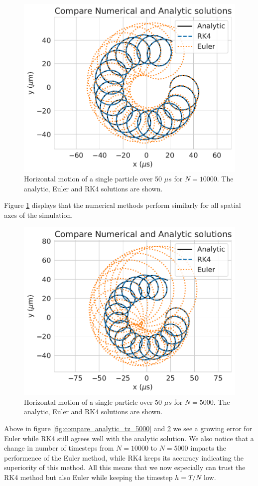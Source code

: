\documentclass[english,notitlepage,reprint,nofootinbib]{revtex4-1}  %
\begin{document}
\begin{figure}[H]
    \centering
    \includegraphics[width=.5\textwidth]{../figures/compare_analytic_axis_0_1_N10000.pdf}
    \caption{Horizontal motion of a single particle over 50 $\mu s$ for $N=10000$. The analytic, Euler and RK4 solutions are shown.}
    \label{fig:compare_analytic_axis_0_1_N10000}
\end{figure}
Figure \ref{fig:compare_analytic_axis_0_1_N10000} displays that the numerical methods perform similarly for all spatial axes of the simulation.
\begin{figure}[H]
    \centering
    \includegraphics[width=.5\textwidth]{../figures/compare_analytic_axis_0_1_N5000.pdf}
    \caption{Horizontal motion of a single particle over 50 $\mu s$ for $N=5000$. The analytic, Euler and RK4 solutions are shown.}
    \label{fig:compare_analytic_axis_0_1_N5000}
\end{figure}
Above in figure \ref{fig:compare_analytic_tz_5000} and \ref{fig:compare_analytic_axis_0_1_N5000} we see a growing error for Euler while RK4 still agrees well with the analytic solution.
We also notice that a change in number of timesteps from $N=10000$ to $N=5000$ impacts the performence of the Euler method, while RK4 keeps its accuracy indicating the superiority of this method.
All this means that we now especially can trust the RK4 method but also Euler while keeping the timestep $h=T/N$ low.
\end{document}
